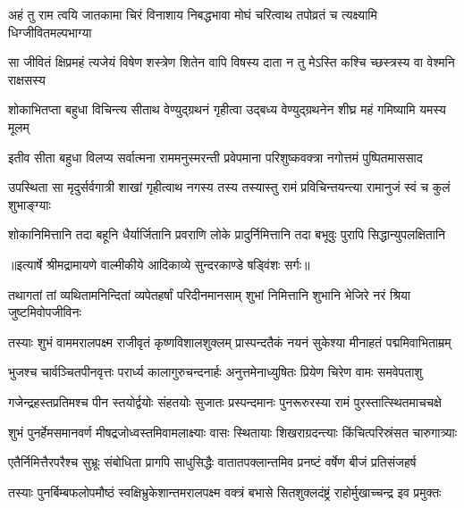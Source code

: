 \fourlineindentedshloka
{अहं तु राम त्वयि जातकामा}
{ चिरं विनाशाय निबद्धभावा}
{मोघं चरित्वाथ तपोव्रतं च}
{ त्यक्ष्यामि धिग्जीवितमल्पभाग्या} %

\fourlineindentedshloka
{सा जीवितं क्षिप्रमहं त्यजेयं}
{ विषेण शस्त्रेण शितेन वापि}
{विषस्य दाता न तु मेऽस्ति कश्चि}
{च्छस्त्रस्य वा वेश्मनि राक्षसस्य} %

\fourlineindentedshloka
{शोकाभितप्ता बहुधा विचिन्त्य}
{ सीताथ वेण्युद्ग्रथनं गृहीत्वा}
{उद्बध्य वेण्युद्ग्रथनेन शीघ्र}
{महं गमिष्यामि यमस्य मूलम्} %

\fourlineindentedshloka
{इतीव सीता बहुधा विलप्य}
{ सर्वात्मना राममनुस्मरन्ती}
{प्रवेपमाना परिशुष्कवक्त्रा}
{ नगोत्तमं पुष्पितमाससाद} %

\fourlineindentedshloka
{उपस्थिता सा मृदुर्सर्वगात्री}
{ शाखां गृहीत्वाथ नगस्य तस्य}
{तस्यास्तु रामं प्रविचिन्तयन्त्या}
{ रामानुजं स्वं च कुलं शुभाङ्ग्याः} %

\fourlineindentedshloka
{शोकानिमित्तानि तदा बहूनि}
{ धैर्यार्जितानि प्रवराणि लोके}
{प्रादुर्निमित्तानि तदा बभूवुः}
{ पुरापि सिद्धान्युपलक्षितानि} %


{॥इत्यार्षे श्रीमद्रामायणे वाल्मीकीये आदिकाव्ये सुन्दरकाण्डे षड्विंशः सर्गः॥}


\fourlineindentedshloka
{तथागतां तां व्यथितामनिन्दितां}
{ व्यपेतहर्षां परिदीनमानसाम्}
{शुभां निमित्तानि शुभानि भेजिरे}
{ नरं श्रिया जुष्टमिवोपजीविनः} %

\fourlineindentedshloka
{तस्याः शुभं वाममरालपक्ष्म}
{ राजीवृतं कृष्णविशालशुक्लम्}
{प्रास्पन्दतैकं नयनं सुकेश्या}
{ मीनाहतं पद्ममिवाभिताम्रम्} %

\fourlineindentedshloka
{भुजश्च चार्वञ्चितपीनवृत्तः}
{ परार्ध्य कालागुरुचन्दनार्हः}
{अनुत्तमेनाध्युषितः प्रियेण}
{ चिरेण वामः समवेपताशु} %

\fourlineindentedshloka
{गजेन्द्रहस्तप्रतिमश्च पीन}
{स्तयोर्द्वयोः संहतयोः सुजातः}
{प्रस्पन्दमानः पुनरूरुरस्या}
{ रामं पुरस्तात्स्थितमाचचक्षे} %

\fourlineindentedshloka
{शुभं पुनर्हेमसमानवर्ण}
{मीषद्रजोध्वस्तमिवामलाक्ष्याः}
{वासः स्थितायाः शिखराग्रदन्त्याः}
{ किंचित्परिस्रंसत चारुगात्र्याः} %

\fourlineindentedshloka
{एतैर्निमित्तैरपरैश्च सुभ्रूः}
{ संबोधिता प्रागपि साधुसिद्धैः}
{वातातपक्लान्तमिव प्रनष्टं}
{ वर्षेण बीजं प्रतिसंजहर्ष} %

\fourlineindentedshloka
{तस्याः पुनर्बिम्बफलोपमौष्ठं}
{ स्वक्षिभ्रुकेशान्तमरालपक्ष्म}
{वक्त्रं बभासे सितशुक्लदंष्ट्रं}
{ राहोर्मुखाच्चन्द्र इव प्रमुक्तः} %

